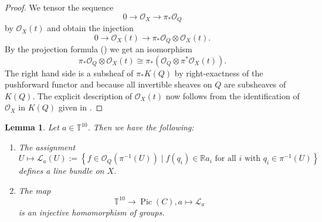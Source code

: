 \documentclass[a4paper,10pt]{amsart}
\theoremstyle{definition}
\theoremstyle{plain}
\newtheorem{lem}[Def]{Lemma}
\newcommand{\Pic}{\operatorname{Pic}}
\newcommand{\cL}{{\mathcal L}}
\newcommand{\cO}{{\mathcal O}}
\newcommand{\R}{{\mathbb R}}
\begin{document}
\begin{proof}
 We tensor the sequence
 \begin{equation*}
  0 \to \cO_X \to \pi_*\cO_Q
 \end{equation*}
 by $\cO_X(t)$ and obtain the injection
 \begin{equation*}
  0 \to \cO_X(t) \to \pi_*\cO_Q \otimes \cO_X(t).
 \end{equation*}
 By the projection formula (\cite[Exercise II.5.1.d]{Hart77}) we get an isomorphism
 \begin{equation*}
     \pi_*\cO_Q \otimes \cO_X(t) \cong \pi_*(\cO_Q \otimes \pi^*\cO_X(t)).
 \end{equation*}
 The right hand side is a subsheaf of $\pi_*K(Q)$ by right-exactness of the pushforward functor and because all invertible sheaves on $Q$ are subsheaves of $K(Q)$. The explicit description of $\cO_X(t)$ now follows from the identification of $\cO_X$ in $K(Q)$ given in .
\end{proof}

\begin{lem}\label{lem:2torexpl}
 Let $a \in \mathbb{T}^{10}$. Then we have the following:
 \begin{enumerate}
     \item The assignment
     \begin{equation*}
         U \mapsto \cL_a(U) := \left\lbrace f \in \cO_Q(\pi^{-1}(U)) \mid f(q_i) \in \R a_i \text{ for all } i \text{ with } q_i \in \pi^{-1}(U) \right\rbrace
     \end{equation*}
     defines a line bundle on $X$.
     \item The map
     \begin{equation*}
        \mathbb{T}^{10} \to \Pic(C), a \mapsto \cL_a
     \end{equation*}
     is an injective homomorphism of groups.
 \end{enumerate}
\end{lem}
\end{document}
